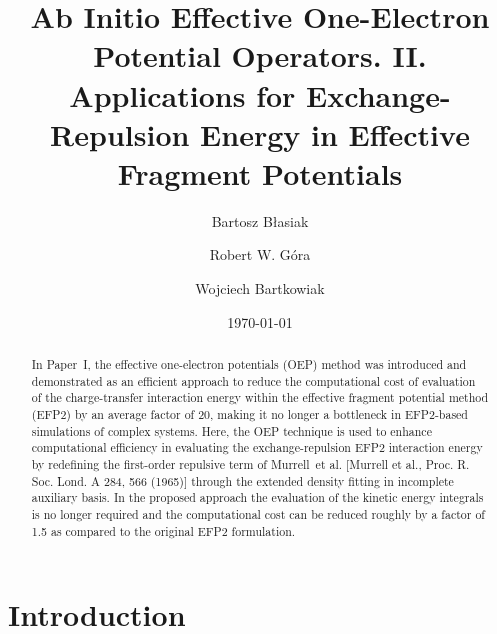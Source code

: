 


\title{Ab Initio Effective One-Electron Potential Operators. II.
Applications for Exchange-Repulsion Energy in Effective Fragment Potentials}

\author{Bartosz B{\l}asiak}

\author{Robert W. G{\'o}ra}
\author{Wojciech Bartkowiak}


\date{\today}

\begin{abstract}
In Paper~I, the effective one\hyp{}electron
potentials (OEP) method was introduced and demonstrated as an
efficient approach
to reduce the computational cost
of evaluation of the charge-transfer interaction energy
within the effective fragment potential method (EFP2)
by an average factor of 20, making it no longer a bottleneck
in EFP2\hyp{}based simulations of complex systems.
Here, the OEP technique 
is used to enhance computational efficiency in evaluating the
exchange\hyp{}repulsion EFP2 interaction energy
by redefining the first\hyp{}order repulsive term of 
Murrell~et al. [Murrell et al., Proc. R. Soc. Lond. A 284, 566 (1965)] through
the extended density fitting in incomplete auxiliary basis.
In the proposed approach the evaluation of the kinetic energy integrals is no
longer required and the computational cost can be reduced roughly by a factor
of 1.5 as compared to the original EFP2 formulation.
\end{abstract}

\pacs{}

\maketitle


\section{\label{s:1.introduction}Introduction}

